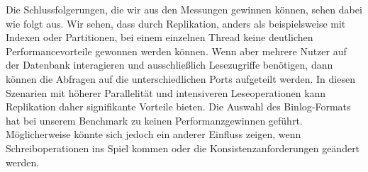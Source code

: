 Die Schlussfolgerungen, die wir aus den Messungen gewinnen können, sehen dabei wie folgt aus.
Wir sehen, dass durch Replikation, anders als beispielsweise mit Indexen oder Partitionen, bei einem einzelnen Thread keine deutlichen Performancevorteile gewonnen werden können.
Wenn aber mehrere Nutzer auf der Datenbank interagieren und ausschließlich Lesezugriffe benötigen, dann können die Abfragen auf die unterschiedlichen Ports aufgeteilt werden.
In diesen Szenarien mit höherer Parallelität und intensiveren Leseoperationen kann Replikation daher signifikante Vorteile bieten.
Die Auswahl des Binlog-Formats hat bei unserem Benchmark zu keinen Performanzgewinnen geführt.
Möglicherweise könnte sich jedoch ein anderer Einfluss zeigen, wenn Schreiboperationen ins Spiel kommen oder die Konsistenzanforderungen geändert werden.
